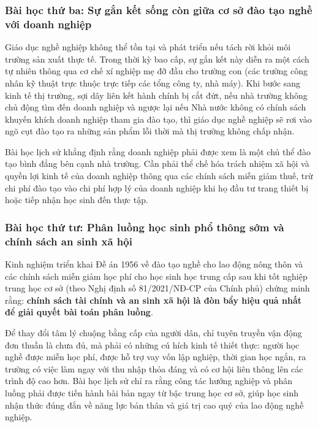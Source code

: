 \subsubsection{Bài học thứ ba: Sự gắn kết sống còn giữa cơ sở đào tạo nghề với doanh nghiệp}

Giáo dục nghề nghiệp không thể tồn tại và phát triển nếu tách rời khỏi môi trường sản xuất thực tế. Trong thời kỳ bao cấp, sự gắn kết này diễn ra một cách tự nhiên thông qua cơ chế xí nghiệp mẹ đỡ đầu cho trường con (các trường công nhân kỹ thuật trực thuộc trực tiếp các tổng công ty, nhà máy). Khi bước sang kinh tế thị trường, sợi dây liên kết hành chính bị cắt đứt, nếu nhà trường không chủ động tìm đến doanh nghiệp và ngược lại nếu Nhà nước không có chính sách khuyến khích doanh nghiệp tham gia đào tạo, thì giáo dục nghề nghiệp sẽ rơi vào ngõ cụt đào tạo ra những sản phẩm lỗi thời mà thị trường không chấp nhận. 

Bài học lịch sử khẳng định rằng doanh nghiệp phải được xem là một chủ thể đào tạo bình đẳng bên cạnh nhà trường. Cần phải thể chế hóa trách nhiệm xã hội và quyền lợi kinh tế của doanh nghiệp thông qua các chính sách miễn giảm thuế, trừ chi phí đào tạo vào chi phí hợp lý của doanh nghiệp khi họ đầu tư trang thiết bị hoặc tiếp nhận học sinh đến thực tập.

\subsubsection{Bài học thứ tư: Phân luồng học sinh phổ thông sớm và chính sách an sinh xã hội}

Kinh nghiệm triển khai Đề án 1956 về đào tạo nghề cho lao động nông thôn và các chính sách miễn giảm học phí cho học sinh học trung cấp sau khi tốt nghiệp trung học cơ sở (theo Nghị định số 81/2021/NĐ-CP của Chính phủ) chứng minh rằng: \textbf{chính sách tài chính và an sinh xã hội là đòn bẩy hiệu quả nhất để giải quyết bài toán phân luồng}. 

Để thay đổi tâm lý chuộng bằng cấp của người dân, chỉ tuyên truyền vận động đơn thuần là chưa đủ, mà phải có những cú hích kinh tế thiết thực: người học nghề được miễn học phí, được hỗ trợ vay vốn lập nghiệp, thời gian học ngắn, ra trường có việc làm ngay với thu nhập thỏa đáng và có cơ hội liên thông lên các trình độ cao hơn. Bài học lịch sử chỉ ra rằng công tác hướng nghiệp và phân luồng phải được tiến hành bài bản ngay từ bậc trung học cơ sở, giúp học sinh nhận thức đúng đắn về năng lực bản thân và giá trị cao quý của lao động nghề nghiệp.
